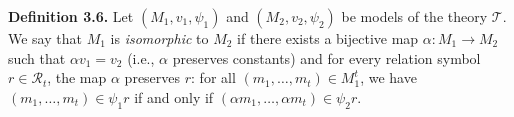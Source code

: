 \textbf{Definition 3.6.} Let $(M_1, v_1, \psi_1)$ and $(M_2, v_2, \psi_2)$ be models of the theory $\mathcal{T}$. We say that $M_1$ is \textit{isomorphic} to $M_2$ if there exists a bijective map $\alpha: M_1 \to M_2$ such that $\alpha v_1 = v_2$ (i.e., $\alpha$ preserves constants) and for every relation symbol $r \in \mathcal{R}_t$, the map $\alpha$ preserves $r$: for all $(m_1, \ldots, m_t) \in M_1^t$, we have $(m_1, \ldots, m_t) \in \psi_1 r$ if and only if $(\alpha m_1, \ldots, \alpha m_t) \in \psi_2 r$.
